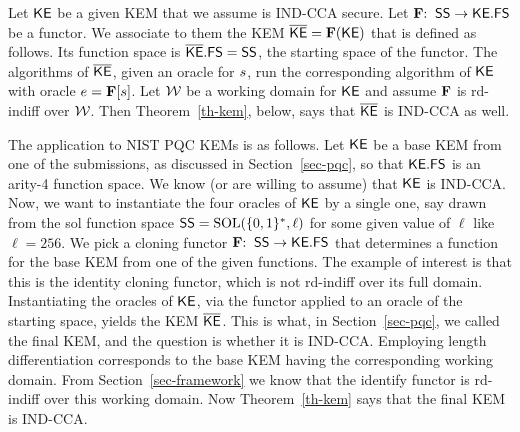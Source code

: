 

 Let ${\mathsf{KE}}$ be a given KEM that we assume is IND-CCA secure. Let $\mathbf{F} {:\;\;} \mathsf{SS} \to \mathsf{{\mathsf{KE}}.FS}$ be a functor. We associate to them the KEM $\overline{\mathsf{KE}} = \mathbf{F}({\mathsf{KE}})$ that is defined as follows. Its function space is $\mathsf{\overline{\mathsf{KE}}.FS} = \mathsf{SS}$, the starting space of the functor. The algorithms of $\overline{\mathsf{KE}}$, given an oracle for $s$, run the corresponding algorithm of ${\mathsf{KE}}$ with oracle $e = \mathbf{F}[s]$. Let ${\cal W}$ be a working domain for ${\mathsf{KE}}$ and assume $\mathbf{F}$ is rd-indiff over ${\cal W}$. Then Theorem~\ref{th-kem}, below, says that $\overline{\mathsf{KE}}$ is IND-CCA as well.

The application to NIST PQC KEMs is as follows. Let ${\mathsf{KE}}$ be a base KEM from one of the submissions, as discussed in Section~\ref{sec-pqc}, so that $\mathsf{{\mathsf{KE}}.FS}$ is an arity-4 function space. We know (or are willing to assume) that ${\mathsf{KE}}$ is IND-CCA. Now, we want to instantiate the four oracles of ${\mathsf{KE}}$ by a single one, say drawn from the sol function space $\mathsf{SS} = \mathrm{SOL}(\{0,1\}^*,\ell)$ for some given value of $\ell$ like $\ell=256$. We pick a cloning functor $\mathbf{F}{:\;\;} \mathsf{SS}\to \mathsf{{\mathsf{KE}}.FS}$ that determines a function for the base KEM from one of the given functions. The example of interest is that this is the identity cloning functor, which is not rd-indiff over its full domain. Instantiating the oracles of ${\mathsf{KE}}$, via the functor applied to an oracle of the starting space, yields the KEM $\overline{\mathsf{KE}}$. This is what, in Section~\ref{sec-pqc}, we called the final KEM, and the question is whether it is IND-CCA. Employing length differentiation corresponds to the base KEM having the corresponding working domain. From Section~\ref{sec-framework} we know that the identify functor is rd-indiff over this working domain. Now Theorem~\ref{th-kem} says that the final KEM is IND-CCA.



